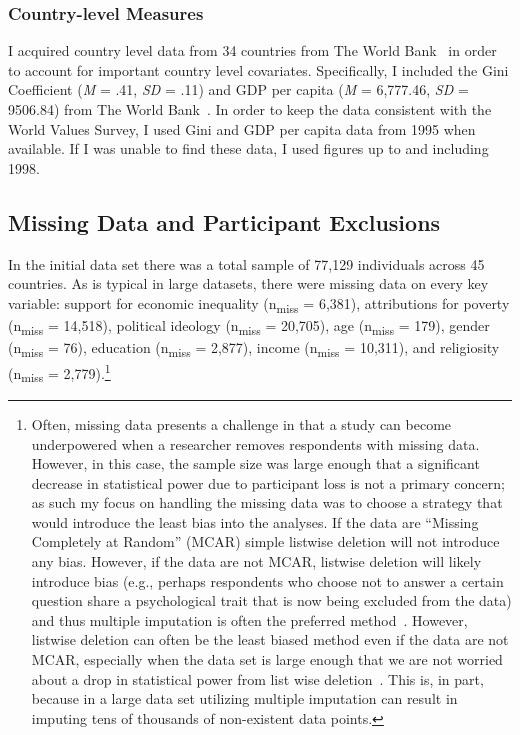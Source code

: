 \documentclass{sfuthesis}
\begin{document}
\subsubsection{Country-level Measures}
I acquired country level data from 34 countries from The World Bank~\cite{worldbank14, worldbank15} in order to account for important country level covariates. Specifically, I included the Gini Coefficient (\textit{M} = .41, \textit{SD} = .11) and GDP per capita (\textit{M} = 6,777.46, \textit{SD} = 9506.84) from The World Bank~\cite{worldbank14, worldbank15}. In order to keep the data consistent with the World Values Survey, I used Gini and GDP per capita data from 1995 when available. If I was unable to find these data, I used figures up to and including 1998. 

\subsection{Missing Data and Participant Exclusions}

In the initial data set there was a total sample of 77,129 individuals across 45 countries. As is typical in large datasets, there were missing data on every key variable: support for economic inequality (n\textsubscript{miss} = 6,381), attributions for poverty (n\textsubscript{miss} = 14,518), political ideology (n\textsubscript{miss} = 20,705), age (n\textsubscript{miss} = 179), gender (n\textsubscript{miss} = 76), education (n\textsubscript{miss} = 2,877), income (n\textsubscript{miss} = 10,311), and religiosity (n\textsubscript{miss} = 2,779).\footnote{Often, missing data presents a challenge in that a study can become underpowered when a researcher removes respondents with missing data. However, in this case, the sample size was large enough that a significant decrease in statistical power due to participant loss is not a primary concern; as such my focus on handling the missing data was to choose a strategy that would introduce the least bias into the analyses. If the data are “Missing Completely at Random” (MCAR) simple listwise deletion will not introduce any bias. However, if the data are not MCAR, listwise deletion will likely introduce bias (e.g., perhaps respondents who choose not to answer a certain question share a psychological trait that is now being excluded from the data) and thus multiple imputation is often the preferred method~\cite{he11}. However, listwise deletion can often be the least biased method even if the data are not MCAR, especially when the data set is large enough that we are not worried about a drop in statistical power from list wise deletion~\cite{allison09}. This is, in part, because in a large data set utilizing multiple imputation can result in imputing tens of thousands of non-existent data points.}  
\end{document}
